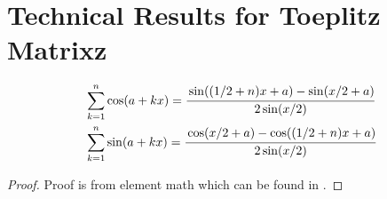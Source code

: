 \section{Technical Results for Toeplitz Matrixz}
\begin{lem}
\label{lemma:sin_cos_seq_sum}
\begin{equation}
\begin{aligned}
&\sum_{k=1}^n \cos(a+kx) = \cfrac{\sin((1/2+n)x+a)-\sin(x/2+a)}{2\sin(x/2)}\\
&\sum_{k=1}^n \sin(a+kx) = \cfrac{\cos(x/2+a)-\cos((1/2+n)x+a)}{2\sin(x/2)}
\end{aligned}
\end{equation}
\begin{proof}
Proof is from element math which can be found in \cite{zygmund2002trigonometric}. 
\end{proof}
\end{lem}


